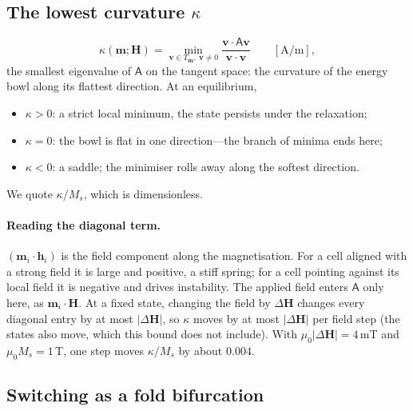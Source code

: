 \documentclass[11pt,a4paper]{article}
\newcommand{\m}{\bm{m}}
\newcommand{\h}{\bm{h}}
\newcommand{\vv}{\bm{v}}
\newcommand{\Hext}{\bm{H}}
\begin{document}
\subsection{\texorpdfstring{The lowest curvature $\kappa$}{The lowest curvature kappa}}

\begin{equation}
  \kappa(\m;\Hext) = \min_{\vv\in T_{\m},\ \vv\neq0} \frac{\vv\cdot\mathsf{A}\vv}{\vv\cdot\vv}
  \qquad [\mathrm{A/m}],
  \label{eq:kappa}
\end{equation}
the smallest eigenvalue of $\mathsf{A}$ on the tangent space: the curvature of the energy bowl along
its flattest direction. At an equilibrium,
\begin{itemize}
  \item $\kappa>0$: a strict local minimum, the state persists under the relaxation;
  \item $\kappa=0$: the bowl is flat in one direction---the branch of minima ends here;
  \item $\kappa<0$: a saddle; the minimiser rolls away along the softest direction.
\end{itemize}
We quote $\kappa/M_s$, which is dimensionless.

\paragraph{Reading the diagonal term.}
$(\m_i\cdot\h_i)$ is the field component along the magnetisation. For a cell aligned with a strong field
it is large and positive, a stiff spring; for a cell pointing against its local field it is negative
and drives instability. The applied field enters $\mathsf{A}$ only here, as $\m_i\cdot\Hext$. At a fixed
state, changing the field by $\Delta\Hext$ changes every diagonal entry by at most $|\Delta\Hext|$, so
$\kappa$ moves by at most $|\Delta\Hext|$ per field step (the states also move, which this bound does not
include). With $\mu_0|\Delta\Hext|=4$\,mT and $\mu_0M_s=1$\,T, one step moves $\kappa/M_s$ by about
$0.004$.

\subsection{Switching as a fold bifurcation}
\end{document}
